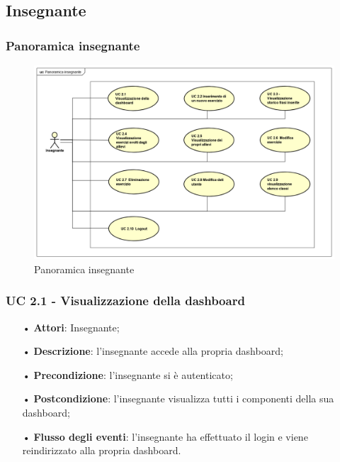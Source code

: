 \subsection{Insegnante}
\subsubsection{Panoramica insegnante}
\begin{figure}[H]
\centering
\includegraphics[width=17cm, keepaspectratio]{img/PanoramicaInsegnanti.png} 
\caption{Panoramica insegnante}
\end{figure}

\subsubsection{UC 2.1 - Visualizzazione della dashboard}
\begin{itemize}
	\item[•] \textbf{Attori}: Insegnante;
	\item[•] \textbf{Descrizione}: l’insegnante accede alla propria dashboard;
	\item[•] \textbf{Precondizione}: l'insegnante si è autenticato;
	\item[•] \textbf{Postcondizione}: l'insegnante visualizza tutti i componenti della sua dashboard;
	\item[•] \textbf{Flusso degli eventi}: l’insegnante ha effettuato il login e viene reindirizzato alla propria dashboard.
\end{itemize}

